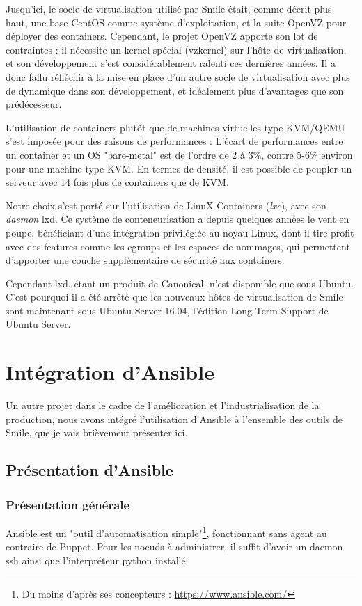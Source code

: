 \documentclass[14 pt]{extreport}
\begin{document}
Jusqu'ici, le socle de virtualisation utilisé par Smile était, comme décrit plus haut, une base CentOS comme système d'exploitation, et la suite OpenVZ pour déployer des containers. Cependant, le projet OpenVZ apporte son lot de contraintes : il nécessite un kernel spécial (vzkernel) sur l'hôte de virtualisation, et son développement s'est considérablement ralenti ces dernières années. Il a donc fallu réfléchir à la mise en place d'un autre socle de virtualisation avec plus de dynamique dans son développement, et idéalement plus d'avantages que son prédécesseur.

L'utilisation de containers plutôt que de machines virtuelles type KVM/QEMU s'est imposée pour des raisons de performances : L'écart de performances entre un container et un OS "bare-metal" est de l'ordre de 2 à 3\%, contre 5-6\% environ pour une machine type KVM. En termes de densité, il est possible de peupler un serveur avec 14 fois plus de containers que de KVM.

Notre choix s'est porté sur l'utilisation de LinuX Containers (\emph{lxc}), avec son \emph{daemon} lxd. Ce système de conteneurisation a depuis quelques années le vent en poupe, bénéficiant d'une intégration privilégiée au noyau Linux, dont il tire profit avec des features comme les cgroups et les espaces de nommages, qui permettent d'apporter une couche supplémentaire de sécurité aux containers. 

Cependant lxd, étant un produit de Canonical, n'est disponible que sous Ubuntu. C'est pourquoi il a été arrêté que les nouveaux hôtes de virtualisation de Smile sont maintenant sous Ubuntu Server 16.04, l'édition Long Term Support de Ubuntu Server.

\section{Intégration d'Ansible}

Un autre projet dans le cadre de l'amélioration et l'industrialisation de la production, nous avons intégré l'utilisation d'Ansible à l'ensemble des outils de Smile, que je vais brièvement présenter ici.
\newpage
\subsection{Présentation d'Ansible}

\subsubsection{Présentation générale}
Ansible est un "outil d'automatisation simple"\footnote{Du moins d'après ses concepteurs : \url{https://www.ansible.com/}}, fonctionnant sans agent au contraire de Puppet. Pour les noeuds à administrer, il suffit d'avoir un daemon ssh ainsi que l'interpréteur python installé. 
\end{document}
